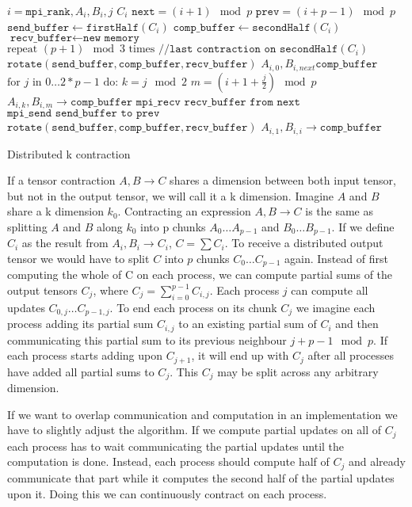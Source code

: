 \begin{algorithm}[ht]
    \begin{algorithmic}
    \Require $i = \texttt{mpi\_rank}, A_i, B_i, j$
    \Ensure $C_i$
    \State $\texttt{next} = (i+1) \mod p$
    \State $\texttt{prev} = (i+p-1) \mod p$
    \State $\texttt{send\_buffer} \gets \texttt{firstHalf}(C_i)$
    \State $\texttt{comp\_buffer} \gets \texttt{secondHalf}(C_i)$
    \State $\texttt{recv\_buffer} \gets \texttt{new memory}$
    \State $\text{repeat } (p+1) \mod 3 \text{ times} \texttt{ //last contraction on secondHalf}(C_i)$ 
    \State \indent $\texttt{rotate}(\texttt{send\_buffer},\texttt{comp\_buffer},\texttt{recv\_buffer})$
    \State $A_{i,0}, B_{i,next} \texttt{comp\_buffer}$
    \State  $\text{for } j \text{ in } 0\dots 2 * p - 1 \text{ do:}$
    \State \indent $ k = j \mod 2 $
    \State \indent $ m = (i + 1 + \frac{j}{2}) \mod p$
    \State \indent {}
    \State \indent \indent $A_{i,k}, B_{i,m} \rightarrow \texttt{comp\_buffer}$
    \State \indent \indent $\texttt{mpi\_recv recv\_buffer from next}$
    \State \indent \indent $\texttt{mpi\_send send\_buffer to prev}$
    \State \indent $\texttt{rotate}(\texttt{send\_buffer},\texttt{comp\_buffer},\texttt{recv\_buffer})$
    \State $A_{i,1}, B_{i,i} \rightarrow \texttt{comp\_buffer}$

\end{algorithmic}
\caption{Distributed k contraction}
\label{alg:k_pseudocode}
\end{algorithm}

If a tensor contraction $A,B \rightarrow C$ shares a dimension between both input tensor, but not in the output tensor, we will call it a k dimension.
Imagine $A$ and $B$ share a k dimension $k_0$.
Contracting an expression $A,B \rightarrow C$ is the same as splitting $A$ and $B$ along $k_0$ into p chunks $A_0\dots A_{p-1}$ and $B_0\dots B_{p-1}$.
If we define $C_i$ as the result from $A_i,B_i \rightarrow C_i$, $C=\sum{C_i}$.
To receive a distributed output tensor we would have to split $C$ into $p$ chunks $C_0\dots C_{p-1}$ again.
Instead of first computing the whole of C on each process, we can compute partial sums of the output tensors $C_j$, where 
$C_j = \sum_{i=0}^{p-1} C_{i,j}$.
Each process $j$ can compute all updates $C_{0,j}\dots C_{p-1,j}$.
To end each process on its chunk $C_j$ we imagine each process adding its partial sum $C_{i,j}$ to an existing partial sum of $C_i$ and then communicating this partial sum to its previous neighbour $j+p-1 \mod p$.
If each process starts adding upon $C_{j+1}$, it will end up with $C_j$ after all processes have added all partial sums to $C_j$.
This $C_j$ may be split across any arbitrary dimension.

If we want to overlap communication and computation in an implementation we have to slightly adjust the algorithm.
If we compute partial updates on all of $C_j$ each process has to wait communicating the partial updates until the computation is done.
Instead, each process should compute half of $C_j$ and already communicate that part while it computes the second half of the partial updates upon it.
Doing this we can continuously contract on each process.